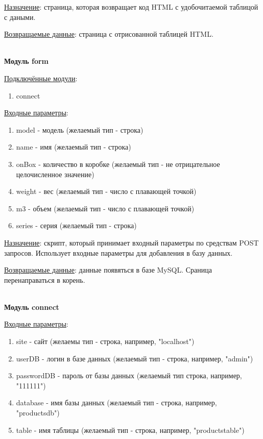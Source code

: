 \underline{Назначение}: страница, которая возвращает код HTML с удобочитаемой таблицой с даными.

\underline{Возвращаемые данные}: страница с отрисованной таблицей HTML.

\hspace{0pt}\\


\textbf{Модуль form}

\underline{Подключённые модули}:

\begin{enumerate}
    \item connect
\end{enumerate}

\underline{Входные параметры}:

\begin{enumerate}
    \item model - модель (желаемый тип - строка)
    \item name - имя (желаемый тип - строка)
    \item onBox - количество в коробке (желаемый тип - не отрицательное целочисленное значение)
    \item weight - вес (желаемый тип - число с плавающей точкой)
    \item m3 - объем (желаемый тип - число с плавающей точкой)     
    \item series - серия (желаемый тип - строка) 
\end{enumerate}

\underline{Назначение}: скрипт, который принимает входный параметры по средствам POST запросов. Использует входные параметры для добавления в базу данных.

\underline{Возвращаемые данные}: данные появяться в базе MySQL. Сраница перенаправаться в корень.

\hspace{0pt}\\


\textbf{Модуль connect}

\underline{Входные параметры}:

\begin{enumerate}
    \item site - сайт (желаемы тип - строка, например,  "localhost")
    \item userDB - логин в базе данных (желаемый тип - строка, например, "admin")
    \item passwordDB - пароль от базы данных (желаемый тип строка, например, "111111")
    \item database - имя базы данных (желаемый тип - строка, например, "productsdb")
    \item table - имя таблицы (желаемый тип - строка, например, "productstable")
\end{enumerate}

